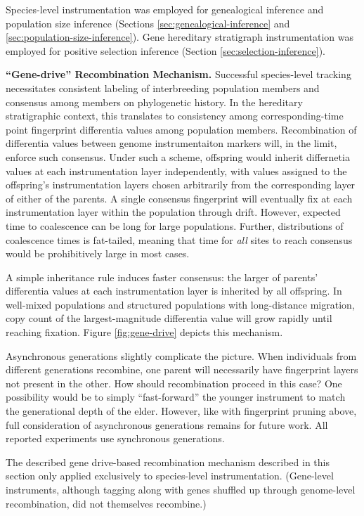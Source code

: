 Species-level instrumentation was employed for genealogical inference and population size inference (Sections \ref{sec:genealogical-inference} and \ref{sec:population-size-inference}).
Gene hereditary stratigraph instrumentation was employed for positive selection inference (Section \ref{sec:selection-inference}).


\textbf{``Gene-drive'' Recombination Mechanism.}
Successful species-level tracking necessitates consistent labeling of interbreeding population members and consensus among members on phylogenetic history.
In the hereditary stratigraphic context, this translates to consistency among corresponding-time point fingerprint differentia values among population members.
Recombination of differentia values between genome instrumentaiton markers will, in the limit, enforce such consensus.
Under such a scheme, offspring would inherit differnetia values at each instrumentation layer independently, with values assigned to the offspring's instrumentation layers chosen arbitrarily from the corresponding layer of either of the parents.
A single consensus fingerprint will eventually fix at each instrumentation layer within the population through drift.
However, expected time to coalescence can be long for large populations.
Further, distributions of coalescence times is fat-tailed, meaning that time for \textit{all} sites to reach consensus would be prohibitively large in most cases.

A simple inheritance rule induces faster consensus: the larger of parents' differentia values at each instrumentation layer is inherited by all offspring.
In well-mixed populations and structured populations with long-distance migration, copy count of the largest-magnitude differentia value will grow rapidly until reaching fixation.
Figure \ref{fig:gene-drive} depicts this mechanism.

Asynchronous generations slightly complicate the picture.
When individuals from different generations recombine, one parent will necessarily have fingerprint layers not present in the other.
How should recombination proceed in this case?
One possibility would be to simply ``fast-forward'' the younger instrument to match the generational depth of the elder.
However, like with fingerprint pruning above, full consideration of asynchronous generations remains for future work.
All reported experiments use synchronous generations.

The described gene drive-based recombination mechanism described in this section only applied exclusively to species-level instrumentation.
(Gene-level instruments, although tagging along with genes shuffled up through genome-level recombination, did not themselves recombine.)

